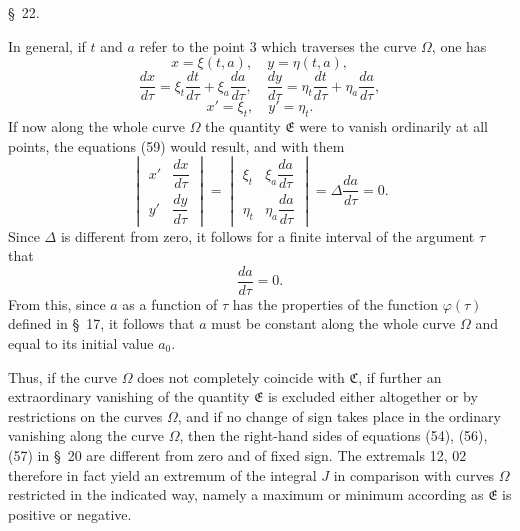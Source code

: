 \documentclass[11pt,a4paper,leqno]{article}
\begin{document}
\begin{center}{\large \S~22.}\end{center}

In general, if $t$ and $a$ refer to the point 3 which traverses the curve $\Omega$, one has
\[
x=\xi(t,a),\quad y=\eta(t,a),
\]
\[
\frac{dx}{d\tau}=\xi_t\frac{dt}{d\tau}+\xi_a\frac{da}{d\tau},\quad
\frac{dy}{d\tau}=\eta_t\frac{dt}{d\tau}+\eta_a\frac{da}{d\tau},
\]
\[
x'=\xi_t,\quad y'=\eta_t.
\]
If now along the whole curve $\Omega$ the quantity $\mathfrak{E}$ were to vanish ordinarily at all points, the equations (59) would result, and with them
\[
\begin{vmatrix}
x' & \dfrac{dx}{d\tau}\\[0.7em]
y' & \dfrac{dy}{d\tau}
\end{vmatrix}
=
\begin{vmatrix}
\xi_t & \xi_a\dfrac{da}{d\tau}\\[0.7em]
\eta_t & \eta_a\dfrac{da}{d\tau}
\end{vmatrix}
=
\Delta\frac{da}{d\tau}=0.
\]
Since $\Delta$ is different from zero, it follows for a finite interval of the argument $\tau$ that
\[
\frac{da}{d\tau}=0.
\]
From this, since $a$ as a function of $\tau$ has the properties of the function $\varphi(\tau)$ defined in \S~17, it follows that $a$ must be constant along the whole curve $\Omega$ and equal to its initial value $a_0$.

Thus, if the curve $\Omega$ does not completely coincide with $\mathfrak{C}$, if further an extraordinary vanishing of the quantity $\mathfrak{E}$ is excluded either altogether or by restrictions on the curves $\Omega$, and if no change of sign takes place in the ordinary vanishing along the curve $\Omega$, then the right-hand sides of equations (54), (56), (57) in \S~20 are different from zero and
of fixed sign. The extremals 12, 02 therefore in fact yield an extremum of the integral $J$ in comparison with curves $\Omega$ restricted in the indicated way, namely a maximum or minimum according as $\mathfrak{E}$ is positive or negative.
\end{document}
